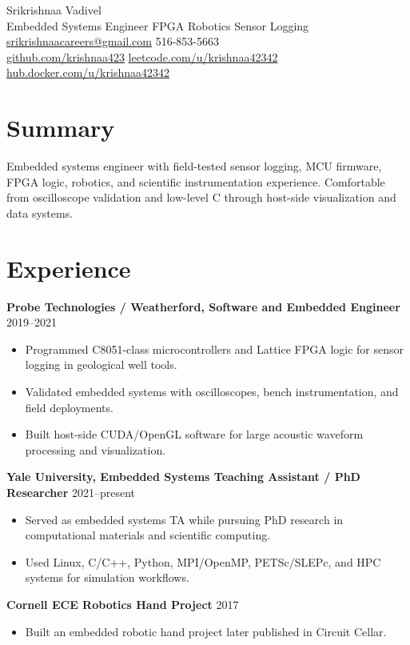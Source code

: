 \documentclass[10pt]{article}
\begin{document}
\begin{center}
{\LARGE Srikrishnaa Vadivel}\\
Embedded Systems Engineer \textbar{} FPGA \textbar{} Robotics \textbar{} Sensor Logging\\
\href{mailto:srikrishnaacareers@gmail.com}{srikrishnaacareers@gmail.com} \textbar{} 516-853-5663\\
\href{https://github.com/krishnaa423}{github.com/krishnaa423} \textbar{}
\href{https://leetcode.com/u/krishnaa42342/}{leetcode.com/u/krishnaa42342} \textbar{}
\href{https://hub.docker.com/u/krishnaa42342}{hub.docker.com/u/krishnaa42342}
\end{center}
\section{Summary}
Embedded systems engineer with field-tested sensor logging, MCU firmware, FPGA
logic, robotics, and scientific instrumentation experience. Comfortable from
oscilloscope validation and low-level C through host-side visualization and data
systems.
\section{Experience}
\textbf{Probe Technologies / Weatherford, Software and Embedded Engineer} \hfill 2019--2021
\begin{itemize}
\item Programmed C8051-class microcontrollers and Lattice FPGA logic for
sensor logging in geological well tools.
\item Validated embedded systems with oscilloscopes, bench instrumentation, and
field deployments.
\item Built host-side CUDA/OpenGL software for large acoustic waveform
processing and visualization.
\end{itemize}
\textbf{Yale University, Embedded Systems Teaching Assistant / PhD Researcher} \hfill 2021--present
\begin{itemize}
\item Served as embedded systems TA while pursuing PhD research in
computational materials and scientific computing.
\item Used Linux, C/C++, Python, MPI/OpenMP, PETSc/SLEPc, and HPC systems for
simulation workflows.
\end{itemize}
\textbf{Cornell ECE Robotics Hand Project} \hfill 2017
\begin{itemize}
\item Built an embedded robotic hand project later published in Circuit Cellar.
\end{itemize}
\end{document}
